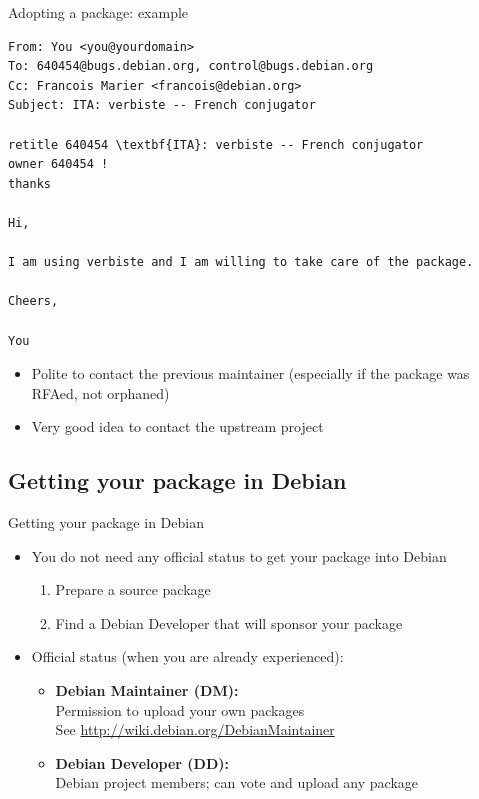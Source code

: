 \documentclass[10pt,final]{beamer}
\begin{document}
\begin{frame}[fragile]{Adopting a package: example}
\begin{lstlisting}[basicstyle=\ttfamily\footnotesize]
From: You <you@yourdomain>
To: 640454@bugs.debian.org, control@bugs.debian.org
Cc: Francois Marier <francois@debian.org>
Subject: ITA: verbiste -- French conjugator

retitle 640454 \textbf{ITA}: verbiste -- French conjugator
owner 640454 !
thanks

Hi,

I am using verbiste and I am willing to take care of the package.

Cheers,

You
\end{lstlisting}

\begin{itemize}
\item Polite to contact the previous maintainer (especially if the package was RFAed, not orphaned)
\item Very good idea to contact the upstream project
\end{itemize}
\end{frame}

\subsection{Getting your package in Debian}
\begin{frame}{Getting your package in Debian}
\begin{itemize}
\item You do not need any official status to get your package into Debian
	\begin{enumerate}
		\item Prepare a source package
			\hbr
		\item Find a Debian Developer that will sponsor your package
	\end{enumerate}
\br
\item Official status (when you are already experienced):
	\begin{itemize}
		\item \textbf{Debian Maintainer (DM):}\\
			Permission to upload your own packages\\
			See \url{http://wiki.debian.org/DebianMaintainer}
			\hbr
		\item \textbf{Debian Developer (DD):}\\
			Debian project members; can vote and upload any package
	\end{itemize}
\end{itemize}
\end{frame}
\end{document}
